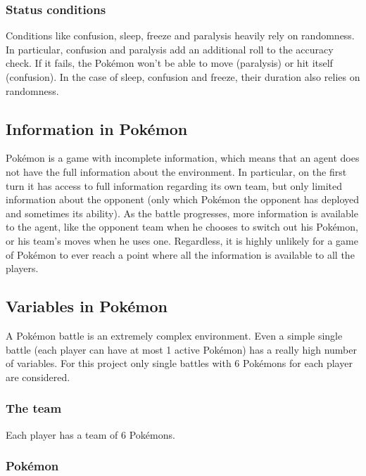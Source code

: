 \documentclass{article}
\begin{document}
\subsubsection{Status conditions}
Conditions like confusion, sleep, freeze and paralysis heavily rely on randomness.
In particular, confusion and paralysis add an additional roll to the accuracy check. If it fails, the Pokémon won't be able to move (paralysis) or hit itself (confusion).
In the case of sleep, confusion and freeze, their duration also relies on randomness.

\subsection{Information in Pokémon}

Pokémon is a game with incomplete information, which means that an agent does not have the full information about the environment.
In particular, on the first turn it has access to full information regarding its own team, but only limited information about the opponent (only which Pokémon the opponent has deployed and sometimes its ability).
As the battle progresses, more information is available to the agent, like the opponent team when he chooses to switch out his Pokémon, or his team's moves when he uses one.
Regardless, it is highly unlikely for a game of Pokémon to ever reach a point where all the information is available to all the players.

\subsection{Variables in Pokémon}

A Pokémon battle is an extremely complex environment.
Even a simple single battle (each player can have at most 1 active Pokémon) has a really high number of variables.
For this project only single battles with 6 Pokémons for each player are considered.

\subsubsection{The team}

Each player has a team of 6 Pokémons.

\subsubsection{Pokémon}
\end{document}
